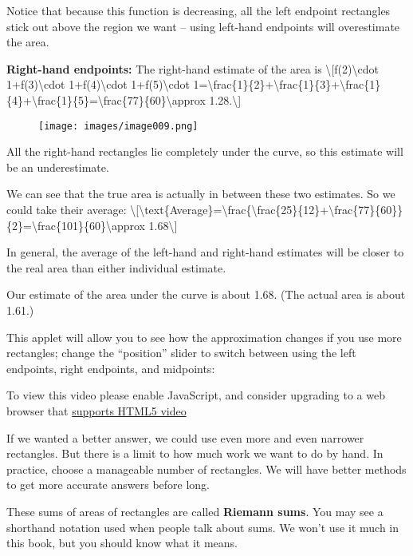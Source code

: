 Notice that because this function is decreasing, all the left endpoint
rectangles stick out above the region we want -- using left-hand
endpoints will overestimate the area.

\textbf{Right-hand endpoints:} The right-hand estimate of the area is
\textbackslash{}{[}f(2)\textbackslash{}cdot 1+f(3)\textbackslash{}cdot
1+f(4)\textbackslash{}cdot 1+f(5)\textbackslash{}cdot
1=\textbackslash{}frac\{1\}\{2\}+\textbackslash{}frac\{1\}\{3\}+\textbackslash{}frac\{1\}\{4\}+\textbackslash{}frac\{1\}\{5\}=\textbackslash{}frac\{77\}\{60\}\textbackslash{}approx
1.28.\textbackslash{}{]}

\begin{figure}
\centering
\texttt{[image: images/image009.png]}
\caption{}
\end{figure}

All the right-hand rectangles lie completely under the curve, so this
estimate will be an underestimate.

We can see that the true area is actually in between these two
estimates. So we could take their average:
\textbackslash{}{[}\textbackslash{}text\{Average\}=\textbackslash{}frac\{\textbackslash{}frac\{25\}\{12\}+\textbackslash{}frac\{77\}\{60\}\}\{2\}=\textbackslash{}frac\{101\}\{60\}\textbackslash{}approx
1.68\textbackslash{}{]}

In general, the average of the left-hand and right-hand estimates will
be closer to the real area than either individual estimate.

Our estimate of the area under the curve is about 1.68. (The actual area
is about 1.61.)

This applet will allow you to see how the approximation changes if you
use more rectangles; change the ``position'' slider to switch between
using the left endpoints, right endpoints, and midpoints:

To view this video please enable JavaScript, and consider upgrading to a
web browser that \href{http://videojs.com/html5-video-support/}{supports
HTML5 video}

If we wanted a better answer, we could use even more and even narrower
rectangles. But there is a limit to how much work we want to do by hand.
In practice, choose a manageable number of rectangles. We will have
better methods to get more accurate answers before long.

These sums of areas of rectangles are called \textbf{Riemann sums}. You
may see a shorthand notation used when people talk about sums. We won't
use it much in this book, but you should know what it means.

